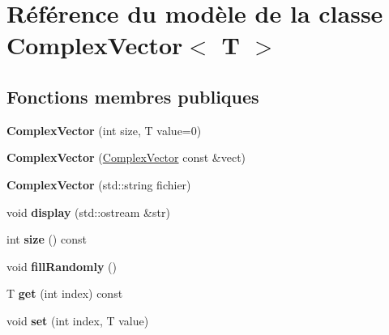 \hypertarget{class_complex_vector}{}\section{Référence du modèle de la classe Complex\+Vector$<$ T $>$}
\label{class_complex_vector}
\subsection*{Fonctions membres publiques}
\begin{DoxyCompactItemize}
\item 
\mbox{\label{class_complex_vector_a868cf12d7135c3050a9343638e26b8bd}} 
{\bfseries Complex\+Vector} (int size, T value=0)
\item 
\mbox{\label{class_complex_vector_a00b90585d0fce0c32d1fa5aa299a6ec9}} 
{\bfseries Complex\+Vector} (\hyperlink{class_complex_vector}{Complex\+Vector} const \&vect)
\item 
\mbox{\label{class_complex_vector_a3f994f171bef799435fb1c1e77929e44}} 
{\bfseries Complex\+Vector} (std\+::string fichier)
\item 
\mbox{\label{class_complex_vector_a313888f3dc8f1229fc2ca5299a615209}} 
void {\bfseries display} (std\+::ostream \&str)
\item 
\mbox{\label{class_complex_vector_a4118a5c55ec18f8cd7b1fe131baa02c4}} 
int {\bfseries size} () const
\item 
\mbox{\label{class_complex_vector_a7d36d4b892b6b705ba539023cdf1aec9}} 
void {\bfseries fill\+Randomly} ()
\item 
\mbox{\label{class_complex_vector_ab88d7f6325d0cda998311401b0510010}} 
T {\bfseries get} (int index) const
\item 
\mbox{\label{class_complex_vector_a4de4d26b4c885b6527f5278940d85d2e}} 
void {\bfseries set} (int index, T value)
\item 
\mbox{\label{class_complex_vector_a7cc169852765ec3d8015b446d9de73bc}} 

\end{DoxyCompactItemize}
